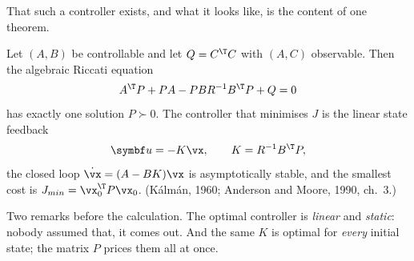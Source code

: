 That such a controller exists, and what it looks like, is the content of one theorem.

\begin{theorem}
\label{thm:lqr-care}
Let $(A, B)$ be controllable and let $Q = C^\T C$ with $(A, C)$ observable. Then the algebraic Riccati equation
\begin{equation}\label{eq:lqr-care}
  A^\T P + PA - PBR^{-1}B^\T P + Q = 0
\end{equation}
has exactly one solution $P \succ 0$. The controller that minimises $J$ is the linear state feedback
\begin{equation}\label{eq:lqr-K}
  \symbf u = -K\vx, \qquad K = R^{-1}B^\T P ,
\end{equation}
the closed loop $\dot{\vx} = (A - BK)\vx$ is asymptotically stable, and the smallest cost is $J_{min} = \vx_0^\T P\vx_0$. (Kálmán, 1960; Anderson and Moore, 1990, ch.~3.)
\end{theorem}

Two remarks before the calculation. The optimal controller is \emph{linear} and \emph{static}: nobody assumed that, it comes out. And the same $K$ is optimal for \emph{every} initial state; the matrix $P$ prices them all at once.

